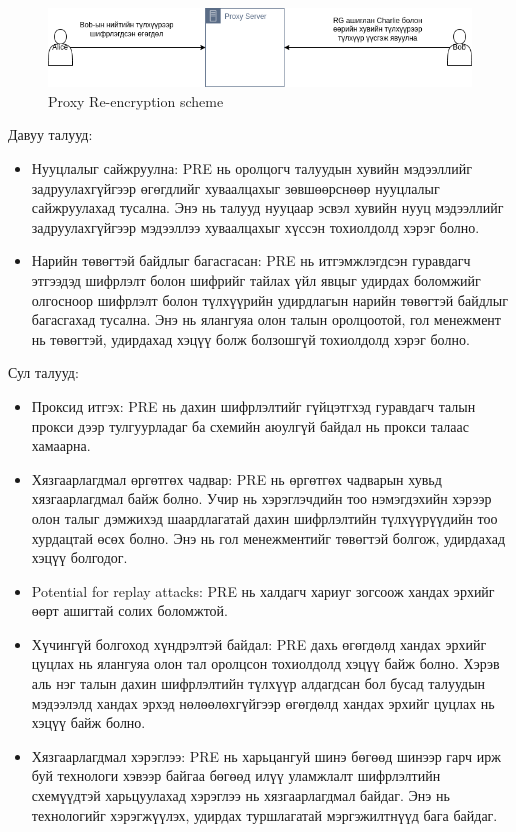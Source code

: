 \begin{figure}[ht]
\centering
\includegraphics[scale=0.5]{Figures/PRE.drawio.png}
\caption[Proxy Re-encryption scheme]{Proxy Re-encryption scheme}
\label{fig:PRE_Scheme}
\end{figure}

Давуу талууд:
\begin{itemize}
    \item Нууцлалыг сайжруулна: PRE нь оролцогч талуудын хувийн мэдээллийг задруулахгүйгээр өгөгдлийг хуваалцахыг зөвшөөрснөөр нууцлалыг сайжруулахад тусална. Энэ нь талууд нууцаар эсвэл хувийн нууц мэдээллийг задруулахгүйгээр мэдээллээ хуваалцахыг хүссэн тохиолдолд хэрэг болно.
    \item Нарийн төвөгтэй байдлыг багасгасан: PRE нь итгэмжлэгдсэн гуравдагч этгээдэд шифрлэлт болон шифрийг тайлах үйл явцыг удирдах боломжийг олгосноор шифрлэлт болон түлхүүрийн удирдлагын нарийн төвөгтэй байдлыг багасгахад тусална. Энэ нь ялангуяа олон талын оролцоотой, гол менежмент нь төвөгтэй, удирдахад хэцүү болж болзошгүй тохиолдолд хэрэг болно.
\end{itemize}

Сул талууд:
\begin{itemize}
    \item Проксид итгэх: PRE нь дахин шифрлэлтийг гүйцэтгхэд гуравдагч талын прокси дээр тулгуурладаг ба схемийн аюулгүй байдал нь прокси талаас хамаарна.
    \item Хязгаарлагдмал өргөтгөх чадвар: PRE нь өргөтгөх чадварын хувьд хязгаарлагдмал байж болно. Учир нь хэрэглэчдийн тоо нэмэгдэхийн хэрээр олон талыг дэмжихэд шаардлагатай дахин шифрлэлтийн түлхүүрүүдийн тоо хурдацтай өсөх болно. Энэ нь гол менежментийг төвөгтэй болгож, удирдахад хэцүү болгодог.
    \item Potential for replay attacks: PRE нь халдагч хариуг зогсоож хандах эрхийг өөрт ашигтай солих боломжтой. 
    \item Хүчингүй болгоход хүндрэлтэй байдал: PRE дахь өгөгдөлд хандах эрхийг цуцлах нь ялангуяа олон тал оролцсон тохиолдолд хэцүү байж болно. Хэрэв аль нэг талын дахин шифрлэлтийн түлхүүр алдагдсан бол бусад талуудын мэдээлэлд хандах эрхэд нөлөөлөхгүйгээр өгөгдөлд хандах эрхийг цуцлах нь хэцүү байж болно.
    \item Хязгаарлагдмал хэрэглээ: PRE нь харьцангуй шинэ бөгөөд шинээр гарч ирж буй технологи хэвээр байгаа бөгөөд илүү уламжлалт шифрлэлтийн схемүүдтэй харьцуулахад хэрэглээ нь хязгаарлагдмал байдаг. Энэ нь технологийг хэрэгжүүлэх, удирдах туршлагатай мэргэжилтнүүд бага байдаг.
\end{itemize}

